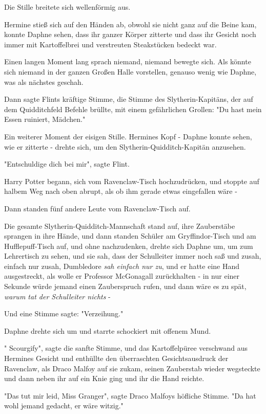 {Die Stille breitete sich wellenförmig aus.

Hermine stieß sich auf den Händen ab, obwohl sie nicht ganz auf die Beine kam, konnte Daphne sehen, dass ihr ganzer Körper zitterte und dass ihr Gesicht noch immer mit Kartoffelbrei und verstreuten Steakstücken bedeckt war.

Einen langen Moment lang sprach niemand, niemand bewegte sich. Als könnte sich niemand in der ganzen Großen Halle vorstellen, genauso wenig wie Daphne, was als nächstes geschah.

Dann sagte Flints kräftige Stimme, die Stimme des Slytherin-Kapitäns, der auf dem Quidditchfeld Befehle brüllte, mit einem gefährlichen Grollen: "Du hast mein Essen ruiniert, Mädchen."

Ein weiterer Moment der eisigen Stille. Hermines Kopf - Daphne konnte sehen, wie er zitterte - drehte sich, um den Slytherin-Quidditch-Kapitän anzusehen.

"Entschuldige dich bei mir", sagte Flint.

Harry Potter begann, sich vom Ravenclaw-Tisch hochzudrücken, und stoppte auf halbem Weg nach oben abrupt, als ob ihm gerade etwas eingefallen wäre -

Dann standen fünf andere Leute vom Ravenclaw-Tisch auf.

Die gesamte Slytherin-Quidditch-Mannschaft stand auf, ihre Zauberstäbe sprangen in ihre Hände, und dann standen Schüler am Gryffindor-Tisch und am Hufflepuff-Tisch auf, und ohne nachzudenken, drehte sich Daphne um, um zum Lehrertisch zu sehen, und sie sah, dass der Schulleiter immer noch saß und zusah, einfach nur zusah, Dumbledore \emph{sah einfach nur zu}, und er hatte eine Hand ausgestreckt, als wolle er Professor McGonagall zurückhalten - in nur einer Sekunde würde jemand einen Zauberspruch rufen, und dann wäre es zu spät, \emph{warum tat der Schulleiter nichts} -

Und eine Stimme sagte: "Verzeihung."

Daphne drehte sich um und starrte schockiert mit offenem Mund.

" Scourgify", sagte die sanfte Stimme, und das Kartoffelpüree verschwand aus Hermines Gesicht und enthüllte den überraschten Gesichtsausdruck der Ravenclaw, als Draco Malfoy auf sie zukam, seinen Zauberstab wieder wegsteckte und dann neben ihr auf ein Knie ging und ihr die Hand reichte.

"Das tut mir leid, Miss Granger", sagte Draco Malfoys höfliche Stimme. "Da hat wohl jemand gedacht, er wäre witzig."

}
